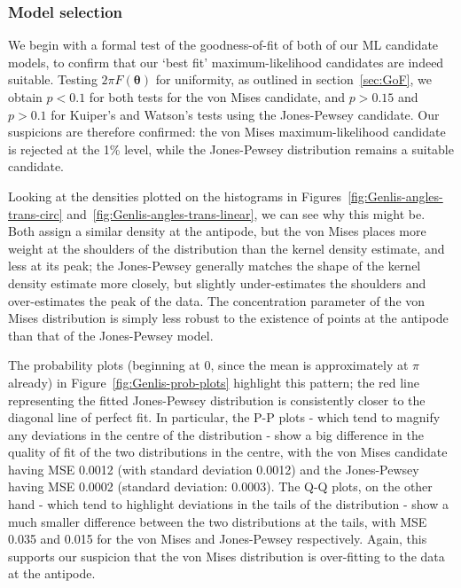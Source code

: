\documentclass[../../ArchStats.tex]{subfiles}
\begin{document}
\subsubsection{Model selection}

We begin with a formal test of the goodness-of-fit of both of our ML candidate models, to confirm that our `best fit' maximum-likelihood candidates are indeed suitable. Testing $2\pi F(\boldsymbol{\theta})$ for uniformity, as outlined in section~\ref{sec:GoF}, we obtain $p < 0.1$ for both tests for the von Mises candidate, and $p > 0.15$ and $p>0.1$ for Kuiper's and Watson's tests using the Jones-Pewsey candidate. Our suspicions are therefore confirmed: the von Mises maximum-likelihood candidate is rejected at the 1\% level, while the Jones-Pewsey distribution remains a suitable candidate.

Looking at the densities plotted on the histograms in Figures~\ref{fig:Genlis-angles-trans-circ} and~\ref{fig:Genlis-angles-trans-linear}, we can see why this might be. Both assign a similar density at the antipode, but the von Mises places more weight at the shoulders of the distribution than the kernel density estimate, and less at its peak; the Jones-Pewsey generally matches the shape of the kernel density estimate more closely, but slightly under-estimates the shoulders and over-estimates the peak of the data. The concentration parameter of the von Mises distribution is simply less robust to the existence of points at the antipode than that of the Jones-Pewsey model.

The probability plots (beginning at 0, since the mean is approximately at $\pi$ already) in Figure~\ref{fig:Genlis-prob-plots} highlight this pattern; the red line representing the fitted Jones-Pewsey distribution is consistently closer to the diagonal line of perfect fit. In particular, the P-P plots - which tend to magnify any deviations in the centre of the distribution - show a big difference in the quality of fit of the two distributions in the centre, with the von Mises candidate having MSE 0.0012 (with standard deviation 0.0012) and the Jones-Pewsey having MSE 0.0002 (standard deviation: 0.0003). The Q-Q plots, on the other hand - which tend to highlight deviations in the tails of the distribution - show a much smaller difference between the two distributions at the tails, with MSE 0.035 and 0.015 for the von Mises and Jones-Pewsey respectively. Again, this supports our suspicion that the von Mises distribution is over-fitting to the data at the antipode.
\end{document}
